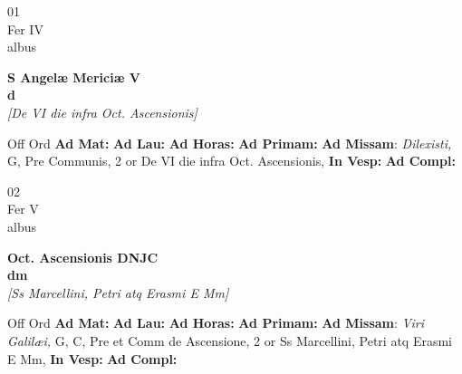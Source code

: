 \documentclass[10pt, openany]{book}
\begin{document}
        \begin{center}
            \begin{minipage}{3.5in}
                \vspace{2em}
                \begin{minipage}{0.5in}
                    {\Huge 01} \\
                    {\normalsize Fer IV} \\
                    {\normalsize albus}
                \end{minipage}
                \begin{minipage}{3.0in}
                    \textbf{ \large S Angelæ Mericiæ V \\
                    \textnormal{\normalsize d}} \\ \textit{[De VI die infra Oct. Ascensionis]} \\ 
                \end{minipage}
                \begin{justify}Off Ord
                    \textbf{Ad Mat: }
                    \textbf{Ad Lau: }
                    \textbf{Ad Horas: }
                    \textbf{Ad Primam: }\textbf{Ad Missam}: \textit{Dilexisti,} G, Pre Communis, 2 or De VI die infra Oct. Ascensionis,  
                    \textbf{In Vesp: }
                    \textbf{Ad Compl: }
                \end{justify}
            \end{minipage}
        \end{center}
    
        \begin{center}
            \begin{minipage}{3.5in}
                \vspace{2em}
                \begin{minipage}{0.5in}
                    {\Huge 02} \\
                    {\normalsize Fer V} \\
                    {\normalsize albus}
                \end{minipage}
                \begin{minipage}{3.0in}
                    \textbf{ \large Oct. Ascensionis DNJC \\
                    \textnormal{\normalsize dm}} \\ \textit{[Ss Marcellini, Petri atq Erasmi E Mm]} \\ 
                \end{minipage}
                \begin{justify}Off Ord
                    \textbf{Ad Mat: }
                    \textbf{Ad Lau: }
                    \textbf{Ad Horas: }
                    \textbf{Ad Primam: }\textbf{Ad Missam}: \textit{Viri Galilæi,} G, C, Pre et Comm de Ascensione, 2 or Ss Marcellini, Petri atq Erasmi E Mm,  
                    \textbf{In Vesp: }
                    \textbf{Ad Compl: }
                \end{justify}
            \end{minipage}
        \end{center}
    
\end{document}
